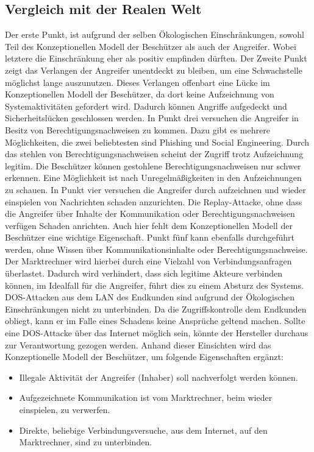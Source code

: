 \documentclass[11pt,a4paper]{report}
\begin{document}
\subsection{Vergleich mit der Realen Welt}

Der erste Punkt, ist aufgrund der selben Ökologischen Einschränkungen, sowohl Teil des Konzeptionellen Modell der Beschützer als auch der Angreifer. Wobei letztere die Einschränkung eher als positiv empfinden dürften. Der Zweite Punkt zeigt das Verlangen der Angreifer unentdeckt zu bleiben, um eine Schwachstelle möglichst lange auszunutzen. Dieses Verlangen offenbart eine Lücke im Konzeptionellen Modell der Beschützer, da dort keine Aufzeichnung von Systemaktivitäten gefordert wird. Dadurch können Angriffe aufgedeckt und Sicherheitslücken geschlossen werden. In Punkt drei versuchen die Angreifer in Besitz von Berechtigungsnachweisen zu kommen. Dazu gibt es mehrere Möglichkeiten, die zwei beliebtesten sind Phishing und Social Engineering. Durch das stehlen von Berechtigungsnachweisen scheint der Zugriff trotz Aufzeichnung legitim. Die Beschützer können gestohlene Berechtigungsnachweisen nur schwer erkennen. Eine Möglichkeit ist nach Unregelmäßigkeiten in den Aufzeichnungen zu schauen. In Punkt vier versuchen die Angreifer durch aufzeichnen und wieder einspielen von Nachrichten schaden anzurichten. Die Replay-Attacke, ohne dass die Angreifer über Inhalte der Kommunikation oder Berechtigungsnachweisen verfügen Schaden anrichten. Auch hier fehlt dem Konzeptionellen Modell der Beschützer eine wichtige Eigenschaft. Punkt fünf kann ebenfalls durchgeführt werden, ohne Wissen über Kommunikationsinhalte oder Berechtigungsnachweise. Der Marktrechner wird hierbei durch eine Vielzahl von Verbindungsanfragen überlastet. Dadurch wird verhindert, dass sich legitime Akteure verbinden können, im Idealfall für die Angreifer, führt dies zu einem Absturz des Systems. DOS-Attacken aus dem LAN des Endkunden sind aufgrund der Ökologischen Einschränkungen nicht zu unterbinden. Da die Zugriffskontrolle dem Endkunden obliegt, kann er im Falle eines Schadens keine Ansprüche geltend machen. Sollte eine DOS-Attacke über das Internet möglich sein, könnte der Hersteller durchaus zur Verantwortung gezogen werden. Anhand dieser Einsichten wird das Konzeptionelle Modell der Beschützer, um folgende Eigenschaften ergänzt:

\begin{itemize}[leftmargin=*]
\item Illegale Aktivität der Angreifer (Inhaber) soll nachverfolgt werden können.
\item Aufgezeichnete Kommunikation ist vom Marktrechner, beim wieder einspielen, zu verwerfen.
\item Direkte, beliebige Verbindungsversuche, aus dem Internet, auf den Marktrechner, sind zu unterbinden.
\end{itemize}
\end{document}
